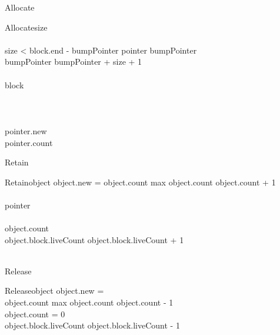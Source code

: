 \documentclass{beamer}
\begin{document}
\begin{frame}{Allocate}
\begin{pseudocode}{Allocate}{size}
	\\\\
	\IF size < block.end - bumpPointer \THEN
		\BEGIN
			pointer \GETS bumpPointer\\
			bumpPointer \GETS bumpPointer + size + 1\\
		\END\\
	\ELSE
		\BEGIN
			block \GETS {}\\
			\\
		\END\\\\
	pointer.new \GETS \TRUE\\
	pointer.count \\
\end{pseudocode}
\end{frame}


\begin{frame}{Retain}
\begin{pseudocode}{Retain}{object}
	\IF object.new = \FALSE \THEN
	\BEGIN
		\IF object.count \NOT max \THEN
		object.count \GETS object.count + 1\\
		\RETURN{}
	\END\\
	pointer \GETS {}\\
	\\
	object.count \\
	object.block.liveCount \GETS object.block.liveCount + 1\\
	\RETURN{}\\
\end{pseudocode}
\end{frame}

\begin{frame}{Release}
\begin{pseudocode}{Release}{object}
	\IF object.new = \TRUE \THEN
		\RETURN{}\\
	\IF object.count \NOT max \THEN
	object.count \GETS object.count - 1\\
	\IF object.count = 0 \THEN
	\BEGIN
		\\
		object.block.liveCount \GETS object.block.liveCount - 1\\
		\\
	\END
\end{pseudocode}
\end{frame}
\end{document}
